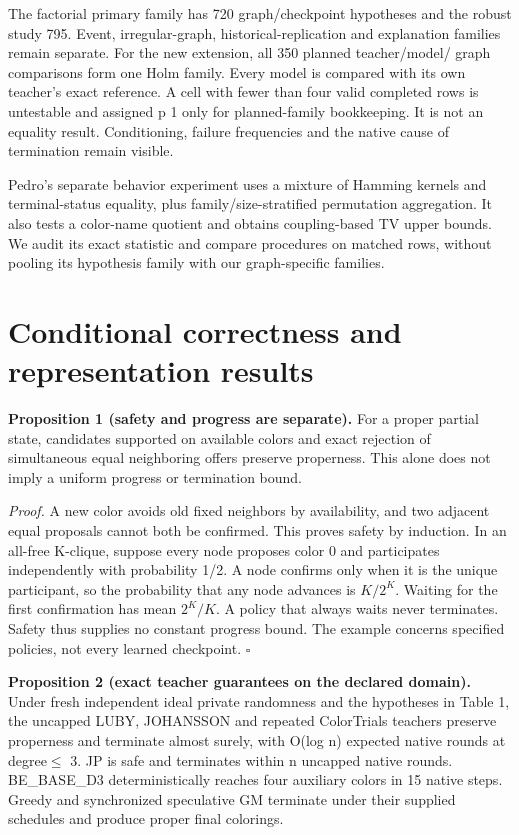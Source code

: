 \documentclass[
  11pt,
]{article}
\begin{document}
The factorial primary family has 720 graph/checkpoint hypotheses and the
robust study 795. Event, irregular-graph, historical-replication and
explanation families remain separate. For the new extension, all 350
planned teacher/model/ graph comparisons form one Holm family. Every
model is compared with its own teacher's exact reference. A cell with
fewer than four valid completed rows is untestable and assigned p 1 only
for planned-family bookkeeping. It is not an equality result.
Conditioning, failure frequencies and the native cause of termination
remain visible.

Pedro's separate behavior experiment uses a mixture of Hamming kernels
and terminal-status equality, plus family/size-stratified permutation
aggregation. It also tests a color-name quotient and obtains
coupling-based TV upper bounds. We audit its exact statistic and compare
procedures on matched rows, without pooling its hypothesis family with
our graph-specific families.

\section{Conditional correctness and representation
results}\label{conditional-correctness-and-representation-results}

\textbf{Proposition 1 (safety and progress are separate).} For a proper
partial state, candidates supported on available colors and exact
rejection of simultaneous equal neighboring offers preserve properness.
This alone does not imply a uniform progress or termination bound.

\emph{Proof.} A new color avoids old fixed neighbors by availability,
and two adjacent equal proposals cannot both be confirmed. This proves
safety by induction. In an all-free K-clique, suppose every node
proposes color 0 and participates independently with probability 1/2. A
node confirms only when it is the unique participant, so the probability
that any node advances is \(K/2^K\). Waiting for the first confirmation
has mean \(2^K/K\). A policy that always waits never terminates. Safety
thus supplies no constant progress bound. The example concerns specified
policies, not every learned checkpoint. \(\square\)

\textbf{Proposition 2 (exact teacher guarantees on the declared
domain).} Under fresh independent ideal private randomness and the
hypotheses in Table 1, the uncapped LUBY, JOHANSSON and repeated
ColorTrials teachers preserve properness and terminate almost surely,
with O(log n) expected native rounds at degree\(\le\) 3. JP is safe and
terminates within n uncapped native rounds. BE\_BASE\_D3
deterministically reaches four auxiliary colors in 15 native steps.
Greedy and synchronized speculative GM terminate under their supplied
schedules and produce proper final colorings.
\end{document}

